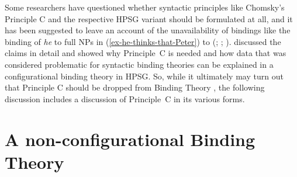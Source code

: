 \documentclass[output=paper,biblatex,babelshorthands,newtxmath,draftmode,colorlinks,citecolor=brown]{langscibook}
\begin{document}
Some researchers have questioned whether syntactic principles like Chomsky's Principle C and the
respective HPSG variant should be formulated at all, and it has been suggested to leave an account of the
unavailability of bindings like the binding of \emph{he} to full NPs in
(\ref{ex-he-thinks-that-Peter}) to  (\citealp[]{Bolinger79a-u}; \citealp[--228]{Bresnan2001a};
\citealp*[]{BMS2001a}). \citet[Section~6]{Walker2011a} discussed the claims in detail
and showed why Principle~C is needed and how data that was considered problematic for syntactic
binding theories can be explained in a configurational binding theory in HPSG. So, while it ultimately may turn
out that Principle C should be dropped from Binding Theory \citep*{VaraschinCulicoverWinkler2021a-u}, the following
discussion includes a discussion of Principle~C in its various forms.

\section{A non-configurational Binding Theory}
\label{binding:sec-a-non-configurational-binding-theory}
\end{document}

